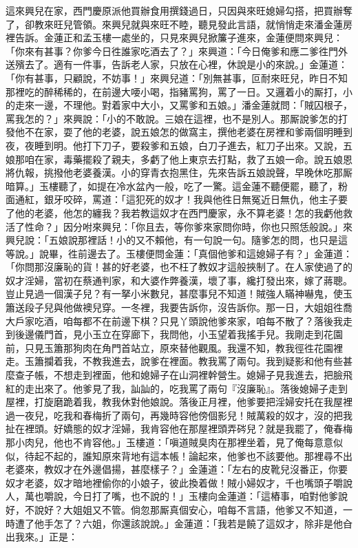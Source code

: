 這來興兒在家，西門慶原派他買辦食用撰錢過日，只因與來旺媳婦勾搭，把買辦奪了，卻教來旺兒管領。來興兒就與來旺不睦，聽見發此言語，就悄悄走來潘金蓮房裡告訴。金蓮正和孟玉樓一處坐的，只見來興兒掀簾子進來，金蓮便問來興兒：「你來有甚事？你爹今日徃誰家吃酒去了？」來興道：「今日俺爹和應二爹徃門外送殯去了。適有一件事，告訴老人家，只放在心裡，休說是小的來說。」金蓮道：「你有甚事，只顧說，不妨事！」來興兒道：「別無甚事，叵耐來旺兒，昨日不知那裡吃的醉稀稀的，在前邊大喓小喝，指豬罵狗，罵了一日。又邏着小的厮打，小的走來一邊，不理他。對着家中大小，又罵爹和五娘。」潘金蓮就問：「賊囚根子，罵我怎的？」來興說：「小的不敢說。三娘在這裡，也不是別人。那厮說爹怎的打發他不在家，耍了他的老婆，說五娘怎的做窩主，撰他老婆在房裡和爹兩個明睡到夜，夜睡到明。他打下刀子，要殺爹和五娘，白刀子進去，紅刀子出來。又說，五娘那咱在家，毒藥擺殺了親夫，多虧了他上東京去打點，救了五娘一命。說五娘恩將仇報，挑撥他老婆養漢。小的穿青衣抱黑住，先來告訴五娘說聲，早晚休吃那厮暗算。」玉樓聽了，如提在冷水盆內一般，吃了一驚。這金蓮不聽便罷，聽了，粉面通紅，銀牙咬碎，罵道：「這犯死的奴才！我與他徃日無冤近日無仇，他主子要了他的老婆，他怎的纏我？我若教這奴才在西門慶家，永不算老婆！怎的我虧他救活了性命？」因分咐來興兒：「你且去，等你爹來家問你時，你也只照恁般說。」來興兒說：「五娘說那裡話！小的又不賴他，有一句說一句。隨爹怎的問，也只是這等說。」{}說畢，徃前邊去了。玉樓便問金蓮：「真個他爹和這媳婦子有？」{}金蓮道：「你問那沒廉恥的貨！甚的好老婆，也不枉了教奴才這般挾制了。在人家使過了的奴才淫婦，當初在蔡通判家，和大婆作弊養漢，壞了事，纔打發出來，嫁了蔣聰。{}豈止見過一個漢子兒？有一拏小米數兒，甚麼事兒不知道！賊強人瞞神嚇鬼，使玉簫送段子兒與他做襖兒穿。一冬裡，我要告訴你，沒告訴你。那一日，大姐姐徃喬大戶家吃酒，咱每都不在前邊下棋？只見丫頭說他爹來家，咱每不散了？落後我走到後邊儀門首，見小玉立在穿廊下，我問他，小玉望着我搖手兒。我剛走到花園前，只見玉簫那狗肉在角門首站立，原來替他觀風。我還不知，教我徑徃花園裡走。玉簫攔着我，不教我進去，說爹在裡面。教我罵了兩句。我到疑影和他有些甚麼查子帳，不想走到裡面，他和媳婦子在山洞裡幹營生。{}媳婦子見我進去，把臉飛紅的走出來了。他爹見了我，訕訕的，吃我罵了兩句『沒廉恥』。落後媳婦子走到屋裡，打旋磨跪着我，教我休對他娘說。落後正月裡，他爹要把淫婦安托在我屋裡過一夜兒，吃我和春梅折了兩句，再幾時容他傍個影兒！賊萬殺的奴才，沒的把我扯在裡頭。好嬌態的奴才淫婦，我肯容他在那屋裡頭弄硶兒？就是我罷了，俺春梅那小肉兒，他也不肯容他。」玉樓道：「嗔道賊臭肉在那裡坐着，見了俺每意意似似，待起不起的，誰知原來背地有這本帳！{}論起來，他爹也不該要他。那裡尋不出老婆來，教奴才在外邊倡揚，甚麼樣子？」金蓮道：「左右的皮靴兒沒番正，你要奴才老婆，奴才暗地裡偷你的小娘子，彼此換着做！賊小婦奴才，千也嘴頭子嚼說人，萬也嚼說，今日打了嘴，也不說的！」{}玉樓向金蓮道：「這樁事，咱對他爹說好，不說好？大姐姐又不管。倘忽那厮真個安心，咱每不言語，他爹又不知道，一時遭了他手怎了？六姐，你還該說說。」金蓮道：「我若是饒了這奴才，除非是他㒲出我來。」正是：

